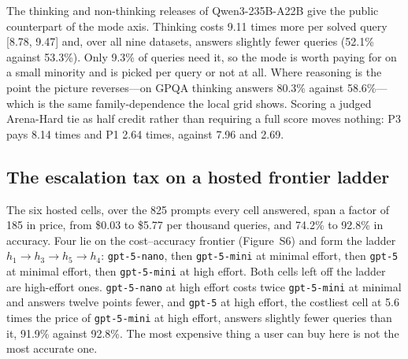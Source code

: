 The thinking and non-thinking releases of Qwen3-235B-A22B give the public
counterpart of the mode axis. Thinking costs 9.11 times more per solved query
[8.78, 9.47] and, over all nine datasets, answers slightly fewer queries
(52.1\% against 53.3\%). Only 9.3\% of queries need it, so the mode is worth
paying for on a small minority and is picked per query or not at all. Where
reasoning is the point the picture reverses---on GPQA thinking answers 80.3\%
against 58.6\%---which is the same family-dependence the local grid shows.
Scoring a judged Arena-Hard tie as half credit rather than requiring a full
score moves nothing: P3 pays 8.14 times and P1 2.64 times, against 7.96 and
2.69.

\subsection{The escalation tax on a hosted frontier ladder}
\label{sec:results-hosted}

\begin{table}[ht]
\centering
\small
\caption{Escalation policies on the hosted ladder under oracle detection, in
US dollars per 1{,}000 queries. The static rows are the ladder rungs used
alone. As on the public pool, a policy that answers fewer queries can show a
negative tax by underpaying through failure, so the tax is read beside the
solved column.}
\label{tab:hosted}

\end{table}

The six hosted cells, over the 825 prompts every cell answered, span a factor
of 185 in price, from \$0.03 to \$5.77 per thousand queries, and 74.2\% to
92.8\% in accuracy. Four lie on the cost--accuracy frontier (Figure~S6) and form the ladder
$h_1 \rightarrow h_3 \rightarrow h_5 \rightarrow h_4$: \texttt{gpt-5-nano},
then \texttt{gpt-5-mini} at minimal effort, then \texttt{gpt-5} at minimal
effort, then \texttt{gpt-5-mini} at high effort. Both cells left off the
ladder are high-effort ones. \texttt{gpt-5-nano} at high effort costs twice
\texttt{gpt-5-mini} at minimal and answers twelve points fewer, and
\texttt{gpt-5} at high effort, the costliest cell at 5.6 times the price of
\texttt{gpt-5-mini} at high effort, answers slightly fewer queries than it,
91.9\% against 92.8\%. The most expensive thing a user can buy here is not
the most accurate one.

